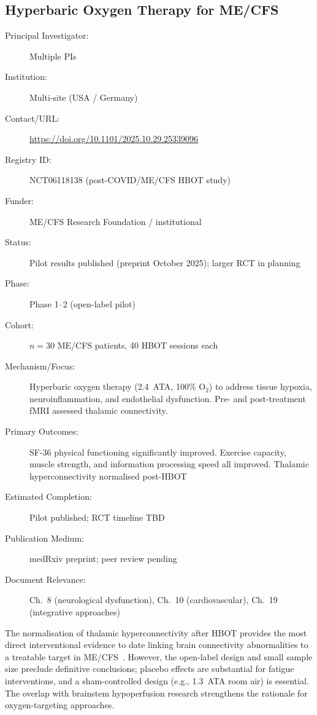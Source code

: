 \subsection{Hyperbaric Oxygen Therapy for ME/CFS}
\label{sec:registry-hbot}

\begin{description}
    \item[Principal Investigator:] Multiple PIs
    \item[Institution:] Multi-site (USA / Germany)
    \item[Contact/URL:] \url{https://doi.org/10.1101/2025.10.29.25339096}
    \item[Registry ID:] NCT06118138 (post-COVID/ME/CFS HBOT study)
    \item[Funder:] ME/CFS Research Foundation / institutional
    \item[Status:] Pilot results published (preprint October 2025);
        larger RCT in planning
    \item[Phase:] Phase 1--2 (open-label pilot)
    \item[Cohort:] $n=30$ ME/CFS patients, 40 HBOT sessions each
    \item[Mechanism/Focus:] Hyperbaric oxygen therapy (2.4~ATA, 100\% O$_2$)
        to address tissue hypoxia, neuroinflammation, and endothelial
        dysfunction.  Pre- and post-treatment fMRI assessed thalamic
        connectivity.
    \item[Primary Outcomes:] SF-36 physical functioning significantly improved.
        Exercise capacity, muscle strength, and information processing speed
        all improved.  Thalamic hyperconnectivity normalised post-HBOT
    \item[Estimated Completion:] Pilot published; RCT timeline TBD
    \item[Publication Medium:] medRxiv preprint; peer review pending
    \item[Document Relevance:] Ch.~8 (neurological dysfunction), Ch.~10
        (cardiovascular), Ch.~19 (integrative approaches)
\end{description}

The normalisation of thalamic hyperconnectivity after HBOT provides the most
direct interventional evidence to date linking brain connectivity abnormalities
to a treatable target in ME/CFS~\cite{HBOT2025mecfs}.  However, the
open-label design and small sample size preclude definitive conclusions;
placebo effects are substantial for fatigue interventions, and a
sham-controlled design (e.g., 1.3~ATA room air) is essential.  The overlap
with brainstem hypoperfusion research strengthens the rationale for
oxygen-targeting approaches.

